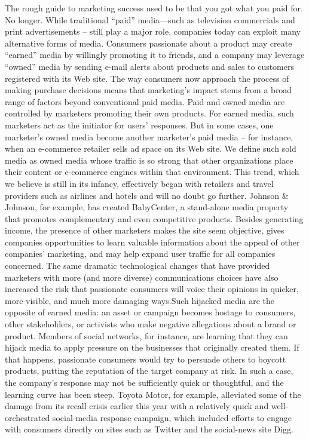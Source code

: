  The rough guide to marketing success used to be that you got what you paid for. No longer. While traditional “paid” media—such as television commercials and print advertisements – still play a major role, companies today can exploit many alternative forms of media. Consumers passionate about a product may create “earned” media by willingly promoting it to friends, and a company may leverage “owned” media by sending e-mail alerts about products and sales to customers registered with its Web site. The way consumers now approach the process of making purchase decisions means that marketing’s impact stems from a broad range of factors beyond conventional paid media.
 Paid and owned media are controlled by marketers promoting their own products. For earned media, such marketers act as the initiator for users’ responses. But in some cases, one marketer’s owned media become another marketer’s paid media – for instance, when an e-commerce retailer sells ad space on its Web site. We define such sold media as owned media whose traffic is so strong that other organizations place their content or e-commerce engines within that environment. This trend, which we believe is still in its infancy, effectively began with retailers and travel providers such as airlines and hotels and will no doubt go further. Johnson \& Johnson, for example, has created BabyCenter, a stand-alone media property that promotes complementary and even competitive products. Besides generating income, the presence of other marketers makes the site seem objective, gives companies opportunities to learn valuable information about the appeal of other companies’ marketing, and may help expand user traffic for all companies concerned.
 The same dramatic technological changes that have provided marketers with more (and more diverse) communications choices have also increased the risk that passionate consumers will voice their opinions in quicker, more visible, and much more damaging ways.Such hijacked media are the opposite of earned media: an asset or campaign becomes hostage to consumers, other stakeholders, or activists who make negative allegations about a brand or product. Members of social networks, for instance, are learning that they can hijack media to apply pressure on the businesses that originally created them.
 If that happens, passionate consumers would try to persuade others to boycott products, putting the reputation of the target company at risk. In such a case, the company’s response may not be sufficiently quick or thoughtful, and the learning curve has been steep. Toyota Motor, for example, alleviated some of the damage from its recall crisis earlier this year with a relatively quick and well-orchestrated social-media response campaign, which included efforts to engage with consumers directly on sites such as Twitter and the social-news site Digg.
